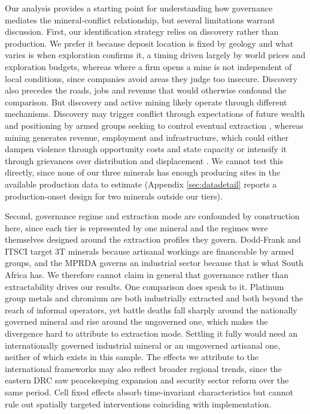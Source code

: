 \documentclass[11pt]{article}
\begin{document}
Our analysis provides a starting point for understanding how governance mediates the mineral-conflict relationship, but several limitations warrant discussion. First, our identification strategy relies on discovery rather than production. We prefer it because deposit location is fixed by geology and what varies is when exploration confirms it, a timing driven largely by world prices and exploration budgets, whereas where a firm opens a mine is not independent of local conditions, since companies avoid areas they judge too insecure. Discovery also precedes the roads, jobs and revenue that would otherwise confound the comparison. But discovery and active mining likely operate through different mechanisms. Discovery may trigger conflict through expectations of future wealth and positioning by armed groups seeking to control eventual extraction \citep{cust2015dutch, lei2019natural}, whereas mining generates revenue, employment and infrastructure, which could either dampen violence through opportunity costs and state capacity or intensify it through grievances over distribution and displacement \citep{aragon2015mining, kotsadam2018industrial}. We cannot test this directly, since none of our three minerals has enough producing sites in the available production data to estimate (Appendix \ref{sec:datadetail} reports a production-onset design for two minerals outside our tiers).

Second, governance regime and extraction mode are confounded by construction here, since each tier is represented by one mineral and the regimes were themselves designed around the extraction profiles they govern. Dodd-Frank and ITSCI target 3T minerals because artisanal workings are financeable by armed groups, and the MPRDA governs an industrial sector because that is what South Africa has. We therefore cannot claim in general that governance rather than extractability drives our results. One comparison does speak to it. Platinum group metals and chromium are both industrially extracted and both beyond the reach of informal operators, yet battle deaths fall sharply around the nationally governed mineral and rise around the ungoverned one, which makes the divergence hard to attribute to extraction mode. Settling it fully would need an internationally governed industrial mineral or an ungoverned artisanal one, neither of which exists in this sample. The effects we attribute to the international frameworks may also reflect broader regional trends, since the eastern DRC saw peacekeeping expansion and security sector reform over the same period. Cell fixed effects absorb time-invariant characteristics but cannot rule out spatially targeted interventions coinciding with implementation.
\end{document}
